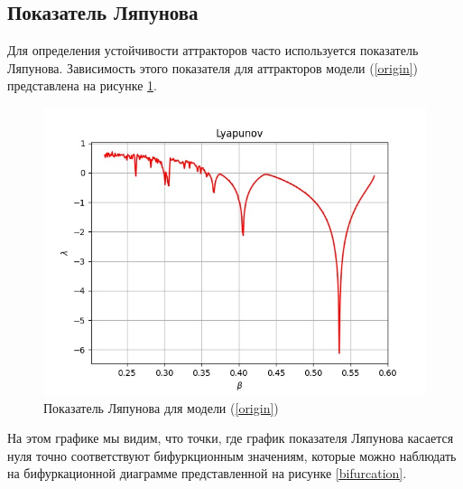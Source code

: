 \subsection{Показатель Ляпунова}    

    Для определения устойчивости аттракторов часто используется показатель Ляпунова. Зависимость этого показателя для аттракторов модели (\ref{origin}) представлена на рисунке \ref{lyapunov}. 

    \begin{figure}
        \centering
        \includegraphics[width=\textwidth]{deterministic/images/lyapunov.jpg}

        \captionsetup{justification=centering}
        \caption{Показатель Ляпунова для модели (\ref{origin})}
        \label{lyapunov}
    \end{figure}

    На этом графике мы видим, что точки, где график показателя Ляпунова касается нуля точно соответствуют бифуркционным значениям, которые можно наблюдать на бифуркационной диаграмме представленной на рисунке \ref{bifurcation}.
